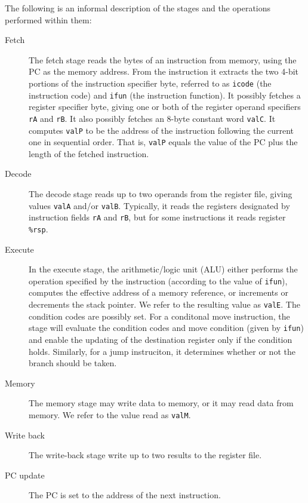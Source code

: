 \documentclass[11pt]{article}
\begin{document}
The following is an informal description of the stages and the operations performed within them:\\
\begin{description}
\item[{Fetch}] The fetch stage reads the bytes of an instruction from memory, using the PC as the memory address. From the instruction it extracts the two 4-bit portions of the instruction specifier byte, referred to as \texttt{icode} (the instruction code) and \texttt{ifun} (the instruction function). It possibly fetches a register specifier byte, giving one or both of the register operand specifiers \texttt{rA} and \texttt{rB}. It also possibly fetches an 8-byte constant word \texttt{valC}. It computes \texttt{valP} to be the address of the instruction following the current one in sequential order. That is, \texttt{valP} equals the value of the PC plus the length of the fetched instruction.\\
\item[{Decode}] The decode stage reads up to two operands from the register file, giving values \texttt{valA} and/or \texttt{valB}. Typically, it reads the registers designated by instruction fields \texttt{rA} and \texttt{rB}, but for some instructions it reads register \texttt{\%rsp}.\\
\item[{Execute}] In the execute stage, the arithmetic/logic unit (ALU) either performs the operation specified by the instruction (according to the value of \texttt{ifun}), computes the effective address of a memory reference, or increments or decrements the stack pointer. We refer to the resulting value as \texttt{valE}. The condition codes are possibly set. For a conditonal move instruction, the stage will evaluate the condition codes and move condition (given by \texttt{ifun}) and enable the updating of the destination register only if the condition holds. Similarly, for a jump instruciton, it determines whether or not the branch should be taken.\\
\item[{Memory}] The memory stage may write data to memory, or it may read data from memory. We refer to the value read as \texttt{valM}.\\
\item[{Write back}] The write-back stage write up to two results to the register file.\\
\item[{PC update}] The PC is set to the address of the next instruction.\\
\end{description}
\end{document}

